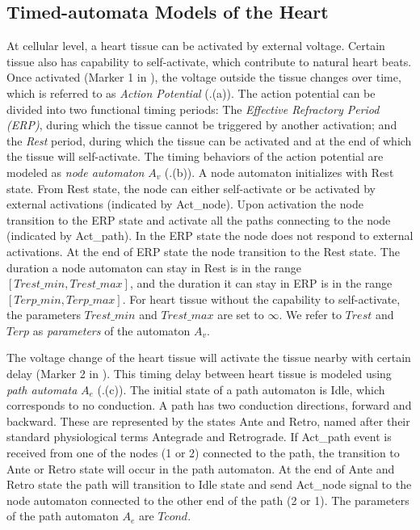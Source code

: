\subsection{Timed-automata Models of the Heart}
At cellular level, a heart tissue can be activated by external voltage. Certain tissue also has capability to self-activate, which contribute to natural heart beats. Once activated (Marker 1 in ), the voltage outside the tissue changes over time, which is referred to as \emph{Action Potential} (.(a)). 
The action potential can be divided into two functional timing periods: The \emph{Effective Refractory Period (ERP)}, during which the tissue cannot be triggered by another activation; and the \emph{Rest} period, during which the tissue can be activated and at the end of which the tissue will self-activate. 
The timing behaviors of the action potential are modeled as \emph{node automaton} $A_v$ (.(b)). 
A node automaton initializes with \textsf{Rest} state.
From \textsf{Rest} state, the node can either self-activate or be activated by external activations (indicated by Act\_node). 
Upon activation the node transition to the \textsf{ERP} state and activate all the paths connecting to the node (indicated by Act\_path). 
In the \textsf{ERP} state the node does not respond to external activations. 
At the end of \textsf{ERP} state the node transition to the \textsf{Rest} state. 
The duration a node automaton can stay in \textsf{Rest} is in the range $[Trest\_min,Trest\_max]$, and the duration it can stay in \textsf{ERP} is in the range $[Terp\_min, Terp\_max]$.
For heart tissue without the capability to self-activate, the parameters $Trest\_min$ and $Trest\_max$ are set to $\infty$.
We refer to $Trest$ and $Terp$ as \emph{parameters} of the automaton $A_v$.

The voltage change of the heart tissue will activate the tissue nearby with certain delay (Marker 2 in ). 
This timing delay between heart tissue is modeled using \emph{path automata} $A_e$ (.(c)). 
The initial state of a path automaton is \textsf{Idle}, which corresponds to no conduction. 
A path has two conduction directions, forward and backward.
These are represented by the states \textsf{Ante} and \textsf{Retro}, named after their standard physiological terms Antegrade and Retrograde.
If \textsf{Act\_path} event is received from one of the nodes (1 or 2) connected to the path, the transition to \textsf{Ante} or \textsf{Retro} state will occur in the path automaton. 
At the end of \textsf{Ante} and \textsf{Retro} state the path will transition to \textsf{Idle} state and send Act\_node signal to the node automaton connected to the other end of the path (2 or 1).
The parameters of the path automaton $A_e$ are $Tcond$.

